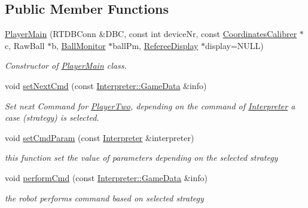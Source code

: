 \subsection*{Public Member Functions}
\begin{DoxyCompactItemize}
\item 
\hyperlink{classPlayerMain_a12957aeecc6902370f03ff2ffbb0551d}{PlayerMain} (RTDBConn \&DBC, const int deviceNr, const \hyperlink{classCoordinatesCalibrer}{CoordinatesCalibrer} $\ast$c, RawBall $\ast$b, \hyperlink{classBallMonitor}{BallMonitor} $\ast$ballPm, \hyperlink{classRefereeDisplay}{RefereeDisplay} $\ast$display=NULL)
\begin{DoxyCompactList}\small\item\em Constructor of \hyperlink{classPlayerMain}{PlayerMain} class. \item\end{DoxyCompactList}\item 
void \hyperlink{classPlayerMain_a8f0320189df15529662c7f16d2f74084}{setNextCmd} (const \hyperlink{structInterpreter_1_1GameData}{Interpreter::GameData} \&info)
\begin{DoxyCompactList}\small\item\em Set next Command for \hyperlink{classPlayerTwo}{PlayerTwo}, depending on the command of \hyperlink{classInterpreter}{Interpreter} a case (strategy) is selected. \item\end{DoxyCompactList}\item 
void \hyperlink{classPlayerMain_a5c4af159392663660f91809052422945}{setCmdParam} (const \hyperlink{classInterpreter}{Interpreter} \&interpreter)
\begin{DoxyCompactList}\small\item\em this function set the value of parameters depending on the selected strategy \item\end{DoxyCompactList}\item 
void \hyperlink{classPlayerMain_af12a95c226ce973056681a138b55fb6c}{performCmd} (const \hyperlink{structInterpreter_1_1GameData}{Interpreter::GameData} \&info)
\begin{DoxyCompactList}\small\item\em the robot performs command based on selected strategy \item\end{DoxyCompactList}\end{DoxyCompactItemize}

